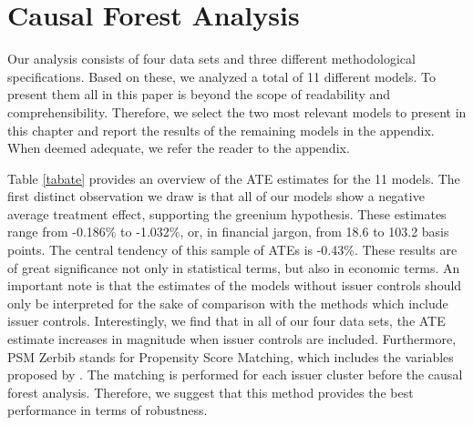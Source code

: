 \newpage

\section{Causal Forest Analysis}

Our analysis consists of four data sets and three different methodological specifications. Based on these, we analyzed a total of 11 different models. To present them all in this paper is beyond the scope of readability and comprehensibility. Therefore, we select the two most relevant models to present in this chapter and report the results of the remaining models in the appendix. When deemed adequate, we refer the reader to the appendix. 

Table \ref{tabate} provides an overview of the ATE estimates for the 11 models. The first distinct observation we draw is that all of our models show a negative average treatment effect, supporting the greenium hypothesis. These estimates range from -0.186\% to -1.032\%, or, in financial jargon, from 18.6 to 103.2 basis points. The central tendency of this sample of ATEs is -0.43\%. These results are of great significance not only in statistical terms, but also in economic terms. An important note is that the estimates of the models without issuer controls should only be interpreted for the sake of comparison with the methods which include issuer controls. Interestingly, we find that in all of our four data sets, the ATE estimate increases in magnitude when issuer controls are included. Furthermore, PSM Zerbib stands for Propensity Score Matching, which includes the variables proposed by \citet{zerbib2017green}. The matching is performed for each issuer cluster before the causal forest analysis. Therefore, we suggest that this method provides the best performance in terms of robustness.

